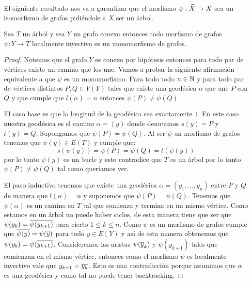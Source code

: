 \documentclass[tesis.tex]{subfiles}
\begin{document}
El siguiente resultado nos va a garantizar que el morfismo $\psi: \widetilde X \to X$ sea un isomorfismo de grafos pidiéndole a $X$ ser un árbol.

\begin{prop}\label{prop_loc_iny}
	Sea $T$ un árbol y sea $Y$ un grafo conexo entonces todo morfismo de grafos $\psi:Y \to T$ localmente inyectivo es un monomorfismo de grafos.    
\end{prop}
\begin{proof}
	Notemos que el grafo $Y$ es conexo por hipótesis entonces para todo par de vértices existe un camino que los une.
	Vamos a probar la siguiente afirmación equivalente a que $\psi$ es un monomorfismo. 
	Para todo todo $n \in \mathbb{N}$ y para todo par de vértices distintos $P,Q \in V(Y)$  tales que existe una geodésica $\alpha$ que une $P$ con $Q$ y que cumple que $l(\alpha) = n$ entonces  $\psi(P) \neq \psi(Q)$.	
		
	
	El caso base es que la longitud de la geodésica sea exactamente $1$.
	En este caso nuestra geodésica es el camino $\alpha = (y)$ donde denotamos $s(y)= P$ y $t(y) = Q$.
	Supongamos que $\psi(P) = \psi(Q)$. 
	Al ser $\psi$ un morfismo de grafos tenemos que $\psi(y) \in E(T)$ y cumple que: 
	\begin{equation*}
		s(\psi(y)) = \psi(P) = \psi(Q) = t(\psi(y))
	\end{equation*}
	por lo tanto $\psi(y)$ es un bucle y esto contradice que $T$ es un árbol por lo tanto $\psi(P) \neq \psi(Q)$ tal como queríamos ver.
	
	
	El paso inductivo tenemos que existe una geodésica $\alpha= (y_1, \dots, y_n)$ entre $P$ y $Q$ de manera que $l(\alpha) = n$ y suponemos que $\psi(P) = \psi(Q)$.
	Tenemos que $\psi(\alpha)$ es un camino en $T$ tal que comienza y termina en un mismo vértice.
	Como estamos en un árbol no puede haber ciclos, de esta manera tiene que ser que $\psi(y_k) = \overline{\psi (y_{k+1})}$ para cierto $1 \le k \le n$.
	Como $\psi$ es un morfismo de grafos cumple que $\overline {\psi(y)} = \psi(\overline y)$ para todo $y \in E(Y)$ y así de esta manera obtenemos que $\psi(y_k) =  \psi(\overline{y_{k+1})}$.
	Consideremos las aristas $\psi(\overline y_{k})$ y $\psi(y_{k+1})$ tales que comienzan en el mismo vértice, entonces como el morfismo $\psi$ es localmente inyectivo vale que $y_{k+1} = \overline{y_k}$. 
	Esto es una contradicción porque asumimos que $\alpha$ es una geodésica y como tal no puede tener backtracking.    
	
\end{proof}
\end{document}
